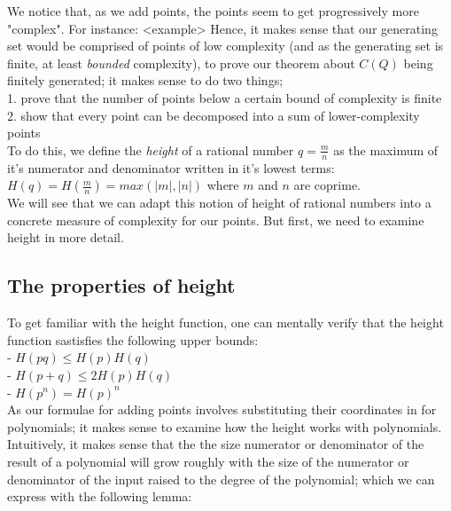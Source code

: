 \documentclass{article}
\begin{document}
We notice that, as we add points, the points seem to get progressively more "complex". For instance: <example>
Hence, it makes sense that our generating set would be comprised of points of low complexity (and as the generating set is finite, at least \emph{bounded} complexity), to prove our theorem about $C(Q)$ being finitely generated; it makes sense to do two things;\\

1. prove that the number of points below a certain bound of complexity is finite \\

2. show that every point can be decomposed into a sum of lower-complexity points \\

To do this, we define the \emph{height} of a rational number $q = \frac{m}{n}$ as the maximum of it's numerator and denominator written in it's lowest terms:\\

$H(q) = H(\frac{m}{n}) = max(|m|, |n|)$ where $m$ and $n$ are coprime.\\

We will see that we can adapt this notion of height of rational numbers into a concrete measure of complexity for our points. But first, we need to examine height in more detail.

\subsection{The properties of height}

To get familiar with the height function, one can mentally verify that the height function sastisfies the following upper bounds:\\

- $H(pq) \leq H(p)H(q)$\\

- $H(p + q) \leq 2H(p)H(q)$\\

- $H(p^n) = H(p)^n$\\

As our formulae for adding points involves substituting their coordinates in for polynomials; it makes sense to examine how the height works with polynomials. Intuitively, it makes sense that the the size numerator or denominator of the result of a polynomial will grow roughly with the size of the numerator or denominator of the input raised to the degree of the polynomial; which we can express with the following lemma:\\
\end{document}
